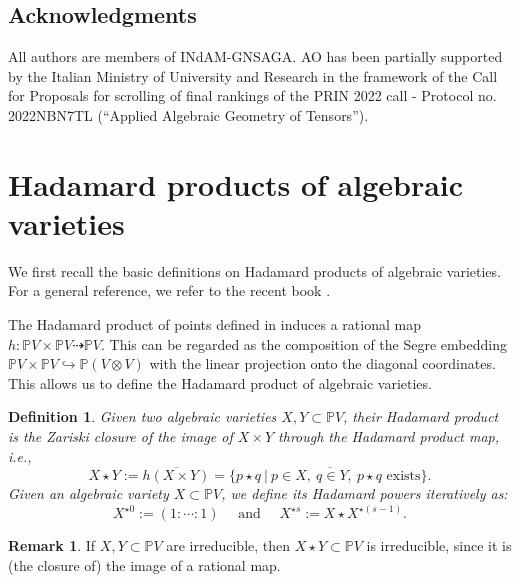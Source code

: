 \documentclass{amsart}
\theoremstyle{plain}
\numberwithin{theorem}{section}
\newtheorem{definition}[theorem]{Definition}
\theoremstyle{definition}
\newtheorem{remark}[theorem]{Remark}
\newcommand{\bbP}{\mathbb{P}}
\begin{document}
\subsection*{Acknowledgments} All authors are members of INdAM-GNSAGA. AO has been partially supported by the Italian Ministry of University and Research in the framework of the Call for Proposals for scrolling of final rankings of the PRIN 2022 call - Protocol no. 2022NBN7TL (“Applied Algebraic Geometry of Tensors”). 

\section{Hadamard products of algebraic varieties}
\label{sec:definitions}

We first recall the basic definitions on Hadamard products of algebraic varieties. For a general reference, we refer to the recent book \cite{bocci2024hadamard}.

The Hadamard product of points defined in  induces a rational map $h\colon \bbP V \times \bbP V \dashrightarrow \bbP V$. This can be regarded as the composition of the Segre embedding $\bbP V \times \bbP V \hookrightarrow \bbP (V\otimes V)$ with the linear projection onto the diagonal coordinates. This allows us to define the Hadamard product of algebraic varieties.

\begin{definition}
    Given two algebraic varieties $X,Y \subset \bbP V$, their \emph{Hadamard product} is the Zariski closure of the image of $X \times Y$ through the Hadamard product map, i.e.,
    \begin{equation}
    \label{def:HadamardProduct}
        X \star Y := \overline{h(X \times Y)} = \overline{\{p \star q ~|~ p \in X, \ q \in Y, \ p \star q \text{ exists}\}.}
    \end{equation}
    Given an algebraic variety $X \subset \bbP V$, we define its \emph{Hadamard powers} iteratively as:
    \[
        X^{\star 0} := (1:\cdots:1) \quad \text{ and } \quad X^{\star s} := X \star X^{\star (s-1)}.
    \]
\end{definition}


\begin{remark}
\label{rmk:hadamardirreducible}
    If $X, Y \subset \bbP V$ are irreducible, then $X \star Y \subset \bbP V$ is irreducible, since it is (the closure of) the image of a rational map.
\end{remark}
\end{document}
